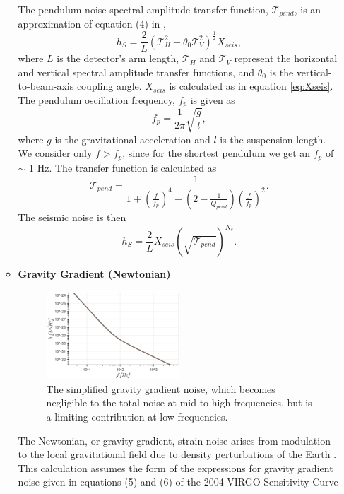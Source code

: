 \documentclass{article}
\begin{document}
\begin{itemize}
\begin{itemize}
    The pendulum noise spectral amplitude transfer function,
    $\mathcal{T}_{pend}$, is an approximation of equation (4) in
    \cite{VIRGO},
    \[
    h_{S} = \frac{2}{L}\left(\mathcal{T}_{H}^2 + \theta_0\mathcal{T}_V^2\right)^{\frac{1}{2}}X_{seis},
    \]
    where $L$ is the detector's arm length, $\mathcal{T}_H$ and
    $\mathcal{T}_V$ represent the horizontal and vertical spectral
    amplitude transfer functions, and $\theta_0$ is the
    vertical-to-beam-axis coupling angle. $X_{seis}$ is calculated as
    in equation \ref{eq:Xseis}.
    The pendulum oscillation frequency, $f_{p}$ is given as
    \[
    f_{p} = \frac{1}{2\pi}\sqrt{\frac{g}{l}} ,
    \] 
    where $g$ is the gravitational acceleration and $l$ is the
    suspension length. We consider only $f > f_p$, since for the
    shortest pendulum we get an $f_p$ of $\sim$ 1 Hz. The transfer
    function is calculated as
    \[
    \mathcal{T}_{pend} = \frac{1}{1 + \left(\frac{f}{f_{p}}\right)^4 - \left(2 - \frac{1}{Q_{pend}}\right)\left(\frac{f}{f_{p}}\right)^2}.
    \]
        The seismic noise is then
    \begin{equation}
        \label{eqn::seismic}
        h_{S} = \frac{2}{L}X_{seis}\left(\sqrt{\mathcal{T}_{pend}}\right)^{N_s}.
    \end{equation}
    \item \textbf{Gravity Gradient (Newtonian)} \\
    \begin{figure}[h!]
    \centering
    \includegraphics[width=0.5\textwidth]{SPQ_aLIGO_gravitygradient.pdf}
    \caption{The simplified gravity gradient noise, which becomes
      negligible to the total noise at mid to high-frequencies, but is
      a limiting contribution at low frequencies.}
    \label{fig:gravity}
    \end{figure}
    The Newtonian, or gravity gradient, strain noise arises from
    modulation to the local gravitational field due to density
    perturbations of the Earth \cite{advLIGO}. This calculation
    assumes the form of the expressions for gravity gradient noise
    given in equations (5) and (6) of the 2004 VIRGO Sensitivity Curve

\end{itemize}
\end{itemize}
\end{document}
